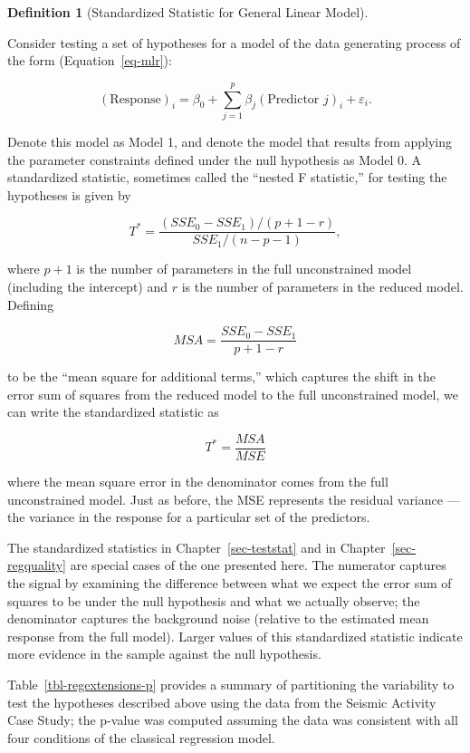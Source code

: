 \documentclass[
  letterpaper,
  DIV=11,
  numbers=noendperiod]{scrreprt}
\theoremstyle{plain}
\theoremstyle{definition}
\theoremstyle{definition}
\newtheorem{definition}{Definition}[chapter]
\theoremstyle{remark}
\begin{document}
\begin{definition}[Standardized Statistic for General Linear
Model]\protect\hypertarget{def-general-f}{}\label{def-general-f}

Consider testing a set of hypotheses for a model of the data generating
process of the form (Equation~\ref{eq-mlr}):

\[(\text{Response})_i = \beta_0 + \sum_{j=1}^{p} \beta_j(\text{Predictor } j)_i + \varepsilon_i.\]

Denote this model as Model 1, and denote the model that results from
applying the parameter constraints defined under the null hypothesis as
Model 0. A standardized statistic, sometimes called the ``nested F
statistic,'' for testing the hypotheses is given by

\[T^* = \frac{\left(SSE_0 - SSE_1\right) / (p + 1 - r)}{SSE_1 / (n - p - 1)},\]

where \(p + 1\) is the number of parameters in the full unconstrained
model (including the intercept) and \(r\) is the number of parameters in
the reduced model. Defining

\[MSA = \frac{SSE_0 - SSE_1}{p + 1 - r}\]

to be the ``mean square for additional terms,'' which captures the shift
in the error sum of squares from the reduced model to the full
unconstrained model, we can write the standardized statistic as

\[T^* = \frac{MSA}{MSE}\]

where the mean square error in the denominator comes from the full
unconstrained model. Just as before, the MSE represents the residual
variance --- the variance in the response for a particular set of the
predictors.

\end{definition}

The standardized statistics in Chapter~\ref{sec-teststat} and in
Chapter~\ref{sec-regquality} are special cases of the one presented
here. The numerator captures the signal by examining the difference
between what we expect the error sum of squares to be under the null
hypothesis and what we actually observe; the denominator captures the
background noise (relative to the estimated mean response from the full
model). Larger values of this standardized statistic indicate more
evidence in the sample against the null hypothesis.

Table~\ref{tbl-regextensions-p} provides a summary of partitioning the
variability to test the hypotheses described above using the data from
the Seismic Activity Case Study; the p-value was computed assuming the
data was consistent with all four conditions of the classical regression
model.
\end{document}
